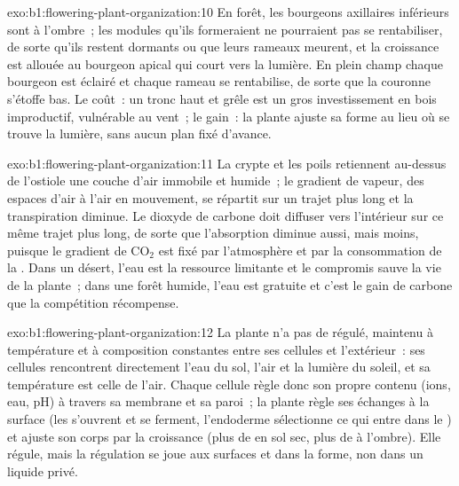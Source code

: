 \begin{solution}{exo:b1:flowering-plant-organization:10}
En forêt, les bourgeons axillaires inférieurs sont à l'ombre~; les
modules qu'ils formeraient ne pourraient pas se rentabiliser, de sorte
qu'ils restent dormants ou que leurs rameaux meurent, et la croissance
est allouée au bourgeon apical qui court vers la lumière. En plein champ
chaque bourgeon est éclairé et chaque rameau se rentabilise, de sorte
que la couronne s'étoffe bas. Le coût~: un tronc haut et grêle est un
gros investissement en bois improductif, vulnérable au vent~; le gain~:
la plante ajuste sa forme au lieu où se trouve la lumière, sans aucun
plan fixé d'avance.
\end{solution}

\begin{solution}{exo:b1:flowering-plant-organization:11}
La crypte et les poils retiennent au-dessus de l'ostiole une couche
d'air immobile et humide~; le gradient de vapeur, des espaces d'air à
l'air en mouvement, se répartit sur un trajet plus long et la
transpiration diminue. Le dioxyde de carbone doit diffuser vers
l'intérieur sur ce même trajet plus long, de sorte que l'absorption
diminue aussi, mais moins, puisque le gradient de $\mathrm{CO_2}$ est
fixé par l'atmosphère et par la consommation de la . Dans un
désert, l'eau est la ressource limitante et le compromis sauve la vie de
la plante~; dans une forêt humide, l'eau est gratuite et c'est le gain
de carbone que la compétition récompense.
\end{solution}

\begin{solution}{exo:b1:flowering-plant-organization:12}
La plante n'a pas de  régulé, maintenu à
température et à composition constantes entre ses cellules et
l'extérieur~: ses cellules rencontrent directement l'eau du sol, l'air
et la lumière du soleil, et sa température est celle de l'air. Chaque
cellule règle donc son propre contenu (ions, eau, pH) à travers sa
membrane et sa paroi~; la plante règle ses échanges à la surface (les
 s'ouvrent et se ferment, l'endoderme sélectionne ce qui entre
dans le ) et ajuste son corps par la croissance (plus de 
en sol sec, plus de  à l'ombre). Elle régule, mais la régulation
se joue aux surfaces et dans la forme, non dans un liquide privé.
\end{solution}

